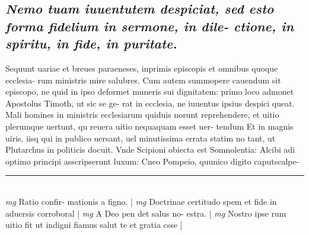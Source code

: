 \documentclass{article}
\begin{document}
\begin{pages}
{}
\subsection*{\textit{Nemo tuam iuuentutem despiciat, sed esto forma fidelium in sermone, in dile- ctione, in spiritu, in fide, in puritate. }}\pstart Sequunt uariae et breues paraeneses, inprimis episcopis et omnibus quoque ecclesia- rum ministris mire salubres. Cum autem summopere cauendum sit episcopo, ne quid in ipso deformet muneris sui dignitatem: primo loco admonet Apostolus Timoth, ut sic se ge- rat in ecclesia, ne iuuentus ipsius despici queat. Mali homines in ministris ecclesiarum quiduis norunt reprehendere, et uitio plerumque uertunt, qu reuera uitio nequaquam esset uer- tendum Et in magnis uiris, iisq qui in publico uersant, uel minutissima errata statim no tant, ut Plutarchus in politicis docuit. Vnde Scipioni obiecta est Somnolentia: Alcibi adi optimo principi asscripserunt luxum: Cneo Pompeio, quunico digito caputscalpe-  \pend
\vspace{0.5cm}\noindent
\vspace{0.2cm}\rule{1cm}{0.2pt}\\ 
\hspace{0.2cm}\textit{mg}
\footnotesize Ratio confir- mationis a figno. 
\normalsize| 
\hspace{0.2cm}\textit{mg}
\footnotesize Doctrinae certitudo spem et fide in aduersis corroboral 
\normalsize| 
\hspace{0.2cm}\textit{mg}
\footnotesize A Deo pen det salus no- estra. 
\normalsize| 
\hspace{0.2cm}\textit{mg}
\footnotesize Nostro ipse rum uitio fit ut indigni fiamus salut te et gratia csse 
\normalsize| 

\end{pages}
\end{document}
